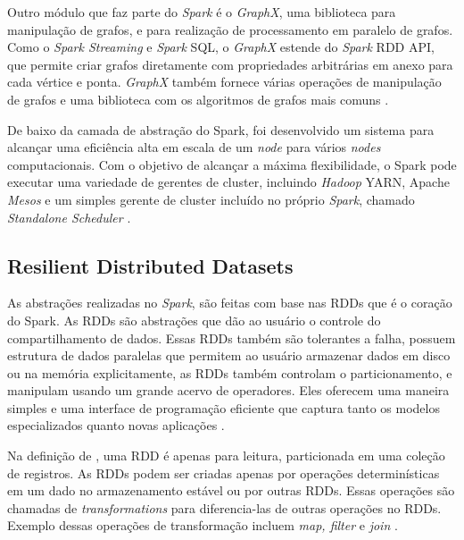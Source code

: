            Outro módulo que faz parte do \textit{Spark} é o \textit{GraphX}, uma biblioteca para manipulação de grafos, e para
            realização de processamento em paralelo de grafos. Como o \textit{Spark Streaming} e \textit{Spark} SQL, o \textit{GraphX}
            estende do \textit{Spark} RDD API, que permite criar grafos diretamente com propriedades arbitrárias em anexo para cada
            vértice e ponta. \textit{GraphX} também fornece várias operações de manipulação de grafos e uma biblioteca com os algoritmos
            de grafos mais comuns \cite{karau2015}.

            De baixo da camada de abstração do Spark, foi desenvolvido um sistema para alcançar uma eficiência alta em escala de
            um \textit{node} para vários \textit{nodes} computacionais. Com o objetivo de alcançar a máxima flexibilidade, o Spark
            pode executar uma variedade de gerentes de cluster, incluindo \textit{Hadoop} YARN, Apache \textit{Mesos} e um simples
            gerente de cluster incluído no próprio \textit{Spark}, chamado \textit{Standalone Scheduler} \cite{karau2015}.

        \subsection{Resilient Distributed Datasets}

            As abstrações realizadas no \textit{Spark}, são feitas com base nas RDDs que é o coração do Spark. As RDDs são abstrações
            que dão ao usuário o controle do compartilhamento de dados. Essas RDDs também são tolerantes a falha, possuem estrutura
            de dados paralelas que permitem ao usuário armazenar dados em disco ou na memória explicitamente, as RDDs também
            controlam o particionamento, e manipulam usando um grande acervo de operadores. Eles oferecem uma maneira simples
            e uma interface de programação eficiente que captura tanto os modelos especializados quanto novas aplicações
            \cite{zaharia2013}.

            Na definição de , uma RDD é apenas para leitura, particionada em uma coleção de registros.
            As RDDs podem ser criadas apenas por operações determinísticas em um dado no armazenamento estável ou por outras
            RDDs. Essas operações são chamadas de \textit{transformations} para diferencia-las de outras operações no RDDs.
            Exemplo dessas operações de transformação incluem \textit{map, filter} e \textit{join} \cite{karau2015}.

